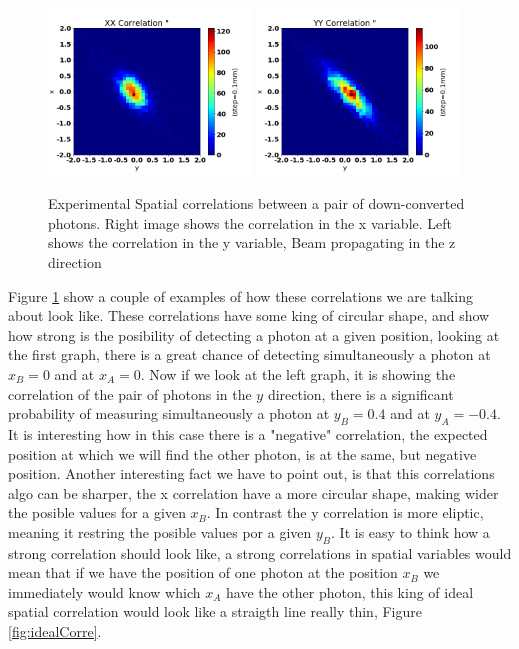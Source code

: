 \begin{figure}[h!]
\centering
{  \includegraphics[width=0.48\textwidth]{Figures/xxCorrelation.png} }
{  \includegraphics[width=0.48\textwidth]{Figures/yyCorrelation.png} }
\caption{Experimental Spatial correlations between a pair of down-converted photons. Right image shows the correlation in the x variable. Left shows the correlation in the y variable, Beam propagating in the z direction}
 \label{fig:corre}
\end{figure}
Figure \ref{fig:corre} show a couple of examples of how these correlations we are talking about look like. These correlations have some king of circular shape,
and show how strong is the posibility of detecting a photon at a given position, looking at the first graph, there is a great chance
of detecting simultaneously a photon at $x_B=0$ and at $x_A=0$. Now if we look at the left graph, it is showing the correlation 
of the pair of photons in the $y$ direction, there is a significant probability of measuring simultaneously a photon at $y_B=0.4$ 
and at $y_A=-0.4$. It is interesting how in this case there is a "negative" correlation, the expected position at which we will find the other photon, is at the same, but negative position.
Another interesting fact we have to point out, is that this correlations algo can be sharper, the x correlation have a more circular shape, making wider the posible values for a given $x_B$. In contrast the y correlation is more eliptic, meaning it restring the posible values por a given $y_B$.
It is easy to think how a strong correlation should look like, a strong correlations in spatial variables would mean that if we have the position of one photon at the position $x_B$ we immediately would know which $x_A$ have the other photon, this king of ideal spatial correlation would look like a straigth line
really thin, Figure \ref{fig:idealCorre}. 


